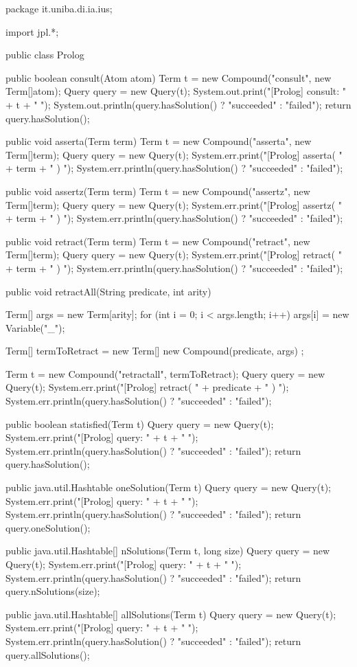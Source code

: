   \begin{javacode}
  package it.uniba.di.ia.ius;
  
  import jpl.*;
  
  public class Prolog {
  	
  	public boolean consult(Atom atom) {
  		Term t = new Compound("consult", new Term[]{atom});
  		Query query = new Query(t);
  		System.out.print("[Prolog] consult: " + t + " ");
  		System.out.println(query.hasSolution() ? "succeeded" : "failed");
  		return query.hasSolution();
  	}
  	
  	public void asserta(Term term) {
  		Term t = new Compound("asserta", new Term[]{term});
  		Query query = new Query(t);
  		System.err.print("[Prolog] asserta( " + term + " ) ");
  		System.err.println(query.hasSolution() ? "succeeded" : "failed");
  	}
  	
  	public void assertz(Term term) {
  		Term t = new Compound("assertz", new Term[]{term});
  		Query query = new Query(t);
  		System.err.print("[Prolog] assertz( " + term + " ) ");
  		System.err.println(query.hasSolution() ? "succeeded" : "failed");
  	}
  	
  	public void retract(Term term) {
  		Term t = new Compound("retract", new Term[]{term});
  		Query query = new Query(t);
  		System.err.print("[Prolog] retract( " + term + " ) ");
  		System.err.println(query.hasSolution() ? "succeeded" : "failed");
  	}
  	
  	public void retractAll(String predicate, int arity) {
  		
  		Term[] args = new Term[arity];
  		for (int i = 0; i < args.length; i++)
  		args[i] = new Variable("_");
  		
  		Term[] termToRetract = new Term[]{ new Compound(predicate, args) };
  		
  		Term t = new Compound("retractall", termToRetract);
  		Query query = new Query(t);
  		System.err.print("[Prolog] retract( " + predicate + " ) ");
  		System.err.println(query.hasSolution() ? "succeeded" : "failed");
  	}
  	
  	public boolean statisfied(Term t) {
  		Query query = new Query(t);
  		System.err.print("[Prolog] query: " + t + " ");
  		System.err.println(query.hasSolution() ? "succeeded" : "failed");
  		return query.hasSolution();
  	}
  	
  	public java.util.Hashtable oneSolution(Term t) {
  		Query query = new Query(t);
  		System.err.print("[Prolog] query: " + t + " ");
  		System.err.println(query.hasSolution() ? "succeeded" : "failed");
  		return query.oneSolution();
  	}
  	
  	public java.util.Hashtable[] nSolutions(Term t, long size) {
  		Query query = new Query(t);
  		System.err.print("[Prolog] query: " + t + " ");
  		System.err.println(query.hasSolution() ? "succeeded" : "failed");
  		return query.nSolutions(size);
  	}
  	
  	public java.util.Hashtable[] allSolutions(Term t) {
  		Query query = new Query(t);
  		System.err.print("[Prolog] query: " + t + " ");
  		System.err.println(query.hasSolution() ? "succeeded" : "failed");
  		return query.allSolutions();
  	}
  }
    \end{javacode}
    
